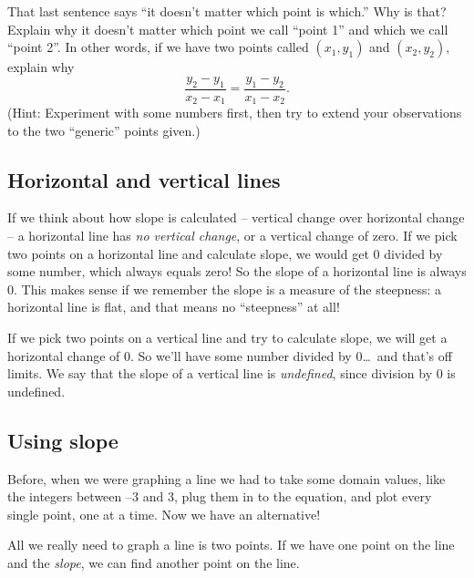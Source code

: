 \begin{boxdef}
That last sentence says ``it doesn't matter which point is which.'' Why is that? Explain why it doesn't matter which point we call ``point 1'' and which we call ``point 2''. In other words, if we have two points called $(x_1, y_1)$ and $(x_2,y_2)$, explain why \[\frac{y_2 - y_1}{x_2 - x_1} = \frac{y_1 - y_2}{x_1 - x_2}.\] (Hint: Experiment with some numbers first, then try to extend your observations to the two ``generic'' points given.)
\end{boxdef}

\subsection{Horizontal and vertical lines}

If we think about how slope is calculated -- vertical change over horizontal change -- a horizontal line has \textit{no vertical change}, or a vertical change of zero. If we pick two points on a horizontal line and calculate slope, we would get 0 divided by some number, which always equals zero! So the slope of a horizontal line is always 0. This makes sense if we remember the slope is a measure of the steepness: a horizontal line is flat, and that means no ``steepness'' at all!

If we pick two points on a vertical line and try to calculate slope, we will get a horizontal change of 0. So we'll have some number divided by 0\ldots\ and that's off limits. We say that the slope of a vertical line is \textit{undefined}, since division by 0 is undefined.

\subsection{Using slope}

Before, when we were graphing a line we had to take some domain values, like the integers between $–3$ and $3$, plug them in to the equation, and plot every single point, one at a time. Now we have an alternative!

All we really need to graph a line is two points. If we have one point on the line and the \textit{slope}, we can find another point on the line.

